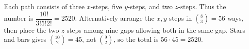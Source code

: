 Each path consists of three $x$-steps, five $y$-steps, and two $z$-steps. Thus the number is $\dfrac{10!}{3!5!2!}=\boxed{2520}$. Alternatively arrange the $x,y$ steps in $\binom83=56$ ways, then place the two $z$-steps among nine gaps allowing both in the same gap. Stars and bars gives $\binom{10}{2}=45$, not $\binom92$, so the total is $56\cdot45=2520$.

